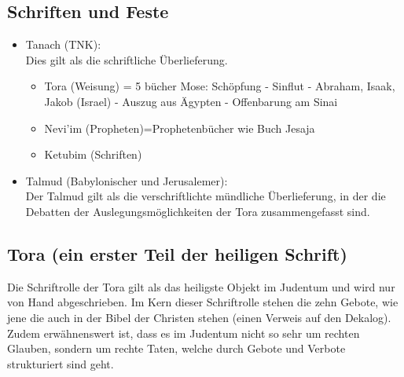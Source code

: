 \subsection*{Schriften und Feste}
	\begin{itemize}
		\item Tanach (TNK):\\
			Dies gilt als die schriftliche Überlieferung.\\
			\begin{itemize}
				\item Tora (Weisung) = 5 bücher Mose: Schöpfung - Sinflut - 							Abraham, Isaak, Jakob (Israel) - Auszug aus Ägypten - Offenbarung 						am Sinai\\
				\item Nevi'im (Propheten)=Prophetenbücher wie Buch Jesaja\\
				\item Ketubim (Schriften)\\
			\end{itemize}
			\item Talmud (Babylonischer und Jerusalemer):\\
				Der Talmud gilt als die verschriftlichte mündliche Überlieferung, in 					der die Debatten der Auslegungsmöglichkeiten der Tora zusammengefasst 					sind.\\
	\end{itemize}
\subsection*{Tora (ein erster Teil der heiligen Schrift)}
Die Schriftrolle der Tora gilt als das heiligste Objekt im Judentum und wird nur von Hand abgeschrieben. Im Kern dieser Schriftrolle stehen die zehn Gebote, wie jene die auch in der Bibel der Christen stehen (einen Verweis auf den Dekalog). Zudem erwähnenswert ist, dass es im Judentum nicht so sehr um rechten Glauben, sondern um rechte Taten, welche durch Gebote und Verbote strukturiert sind geht.\\